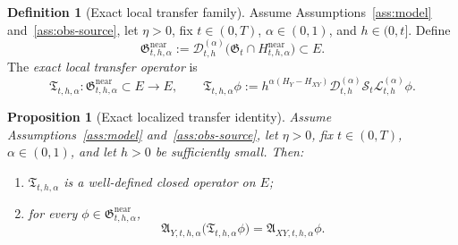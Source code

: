 \documentclass[11pt,a4paper]{amsart}
\theoremstyle{plain}
\newtheorem{proposition}[theorem]{Proposition}
\theoremstyle{definition}
\newtheorem{definition}[theorem]{Definition}
\theoremstyle{remark}
\begin{document}
\begin{definition}[Exact local transfer family]\label{def:local-transfer}
Assume Assumptions~\ref{ass:model} and~\ref{ass:obs-source}, let $\eta>0$, fix $t\in(0,T)$,
$\alpha\in(0,1)$, and $h\in(0,t]$. Define
\[
\mathfrak G_{t,h,\alpha}^{\mathrm{near}}
:=
\mathcal D_{t,h}^{(\alpha)}
\bigl(
\mathfrak G_t\cap H_{t,h,\alpha}^{\mathrm{near}}
\bigr)
\subset E.
\]
The \emph{exact local transfer operator} is
\begin{equation}\label{eq:local-transfer}
\mathfrak T_{t,h,\alpha}:\mathfrak G_{t,h,\alpha}^{\mathrm{near}}\subset E\to E,
\qquad
\mathfrak T_{t,h,\alpha}\phi
:=
h^{\alpha(H_Y-H_{XY})}
\mathcal D_{t,h}^{(\alpha)}
\mathcal S_t
\mathcal L_{t,h}^{(\alpha)}\phi.
\end{equation}
\end{definition}

\begin{proposition}[Exact localized transfer identity]
\label{prop:local-transfer}
Assume Assumptions~\ref{ass:model} and~\ref{ass:obs-source}, let $\eta>0$, fix $t\in(0,T)$,
$\alpha\in(0,1)$, and let $h>0$ be sufficiently small. Then:
\begin{enumerate}[label=(\roman*)]
\item $\mathfrak T_{t,h,\alpha}$ is a well-defined closed operator on $E$;
\item for every $\phi\in\mathfrak G_{t,h,\alpha}^{\mathrm{near}}$,
\begin{equation}\label{eq:local-transfer-eq}
\mathfrak A_{Y,t,h,\alpha}\bigl(\mathfrak T_{t,h,\alpha}\phi\bigr)
=
\mathfrak A_{XY,t,h,\alpha}\phi.
\end{equation}
\end{enumerate}
\end{proposition}
\end{document}
